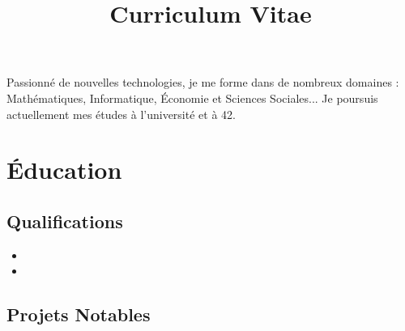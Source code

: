 \documentclass[11pt,a4paper,sans]{moderncv}        %
\title{Curriculum Vitae}                               %
\begin{document}
\makecvtitle

\small{Passionné de nouvelles technologies, je me forme dans de nombreux domaines : Mathématiques, Informatique, Économie et Sciences Sociales... Je poursuis actuellement mes études à l'université et à 42.}

\section{Éducation}

\vspace{5pt}

\subsection{Qualifications}

\vspace{5pt}

\begin{itemize}
	
	\item{}
	
	\item{}
	
\end{itemize}

\vspace{2pt}

\subsection{Projets Notables}

\vspace{5pt}
\end{document}
